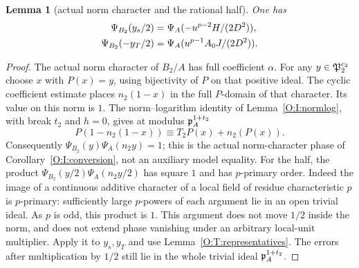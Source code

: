 \documentclass[11pt]{amsart}
\newtheorem{lemma}[theorem]{Lemma}
\theoremstyle{definition}
\theoremstyle{remark}
\begin{document}
\begin{lemma}[actual norm character and the rational half]\label{O:T:actualnorm}
One has
\begin{align}\label{O:T:normhalves}
 \Psi_{B_2}(y_s/2)&=\Psi_A(-u^{p-2}H/(2D^2)),\notag\\
 \Psi_{B_2}(-y_T/2)&=\Psi_A(u^{p-1}A_0J/(2D^2)).
\end{align}
\end{lemma}
\begin{proof}
The actual norm character of $B_2/A$ has full coefficient $\alpha$.
For any $y\in\mathfrak P_2^{c_2}$ choose $x$ with $P(x)=y$, using
bijectivity of $P$ on that positive ideal. The cyclic coefficient
estimate places $n_2(1-x)$ in the full $P$-domain of that character.
Its value on this norm is $1$. The norm--logarithm identity of
Lemma~\ref{O:I:normlog}, with break $t_2$ and $h=0$, gives at modulus $\mathfrak p_A^{1+t_2}$
\[
 P(1-n_2(1-x))\equiv T_2P(x)+n_2(P(x)).
\]
Consequently $\Psi_{B_2}(y)\Psi_A(n_2y)=1$; this is the actual
norm-character phase of Corollary~\ref{O:I:conversion}, not an auxiliary model equality.
For the half, the product
$\Psi_{B_2}(y/2)\Psi_A(n_2y/2)$ has square $1$ and has $p$-primary
order. Indeed the image of a continuous additive character of a
local field of residue characteristic $p$ is $p$-primary: sufficiently
large $p$-powers of each argument lie in an open trivial ideal.
As $p$ is odd, this product is $1$. This argument does not move
$1/2$ inside the norm, and does not extend phase vanishing under an
arbitrary local-unit multiplier.
Apply it to $y_s,y_T$ and use Lemma~\ref{O:T:representatives}.
The errors after multiplication by $1/2$ still lie in the whole
trivial ideal $\mathfrak p_A^{1+t_2}$.
\end{proof}
\end{document}

